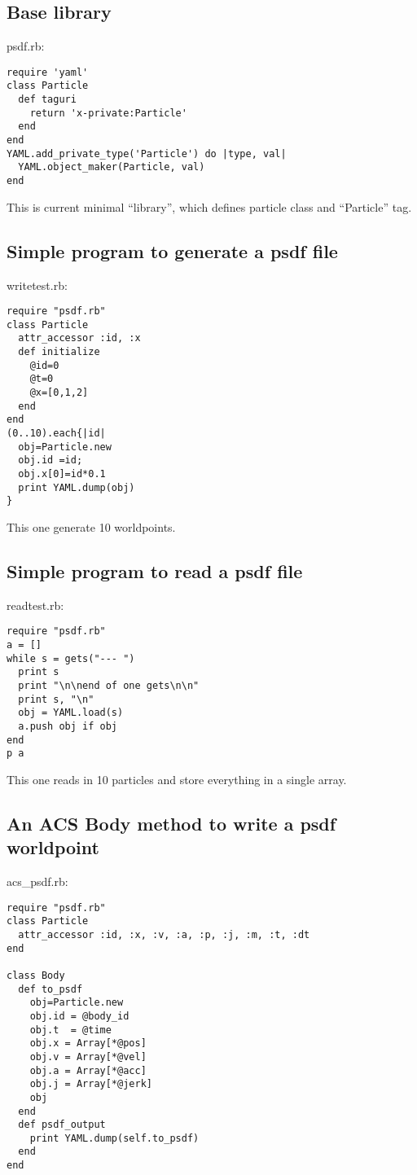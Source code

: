 \documentclass[12pt]{article}
\begin{document}
\subsection{Base library}
psdf.rb:
\begin{verbatim}
require 'yaml'
class Particle
  def taguri
    return 'x-private:Particle'
  end
end
YAML.add_private_type('Particle') do |type, val|
  YAML.object_maker(Particle, val)
end
\end{verbatim}

This is current minimal ``library'', which defines particle class and
``Particle'' tag.

\subsection{Simple program to generate a psdf file}

writetest.rb:
\begin{verbatim}
require "psdf.rb"
class Particle
  attr_accessor :id, :x   
  def initialize
    @id=0
    @t=0
    @x=[0,1,2]
  end
end
(0..10).each{|id|
  obj=Particle.new
  obj.id =id;
  obj.x[0]=id*0.1
  print YAML.dump(obj)
}
\end{verbatim}

This one generate 10 worldpoints.

\subsection{Simple program to read a psdf file}

readtest.rb:
\begin{verbatim}
require "psdf.rb"
a = []
while s = gets("--- ")
  print s
  print "\n\nend of one gets\n\n"
  print s, "\n"
  obj = YAML.load(s) 
  a.push obj if obj
end
p a
\end{verbatim}

This one reads in 10 particles and store everything in a single array.

\subsection{An ACS Body method to write a psdf worldpoint}

acs\_psdf.rb:
\begin{verbatim}
require "psdf.rb"
class Particle
  attr_accessor :id, :x, :v, :a, :p, :j, :m, :t, :dt
end

class Body
  def to_psdf
    obj=Particle.new
    obj.id = @body_id
    obj.t  = @time
    obj.x = Array[*@pos]
    obj.v = Array[*@vel]
    obj.a = Array[*@acc]
    obj.j = Array[*@jerk]
    obj
  end
  def psdf_output
    print YAML.dump(self.to_psdf)
  end
end
\end{verbatim}
\end{document}
